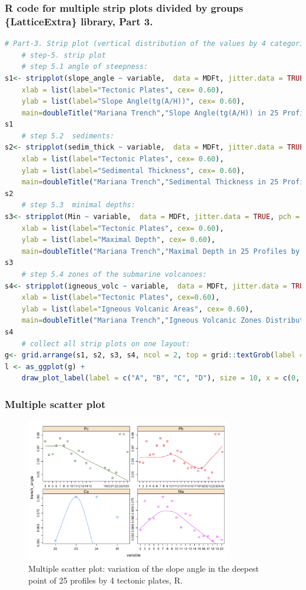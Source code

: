 \documentclass[pdflatex,compress,10pt,
	xcolor={dvipsnames,dvipsnames,svgnames,x11names,table},
	hyperref={colorlinks = true,breaklinks = true, urlcolor = NavyBlue, breaklinks = true}]{beamer}
\begin{document}
\begin{frame}[fragile,shrink=20]\frametitle{R code for multiple strip plots divided by groups\\ \{LatticeExtra\} library, Part 3.}
\begin{lstlisting}[language=R]
# Part-3. Strip plot (vertical distribution of the values by 4 categories))
	# step-5. strip plot 
	# step 5.1 angle of steepness:
s1<- stripplot(slope_angle ~ variable,  data = MDFt, jitter.data = TRUE, pch = 20,  palette="Set2",
	xlab = list(label="Tectonic Plates", cex= 0.60), 
	ylab = list(label="Slope Angle(tg(A/H))", cex= 0.60), 
	main=doubleTitle("Mariana Trench","Slope Angle(tg(A/H)) in 25 Profiles by Tectonic Plates"))
s1		
	# step 5.2  sediments:
s2<- stripplot(sedim_thick ~ variable,  data = MDFt, jitter.data = TRUE, pch = 20,  
	xlab = list(label="Tectonic Plates", cex= 0.60), 
	ylab = list(label="Sedimental Thickness", cex= 0.60), 
	main=doubleTitle("Mariana Trench","Sedimental Thickness in 25 Profiles by Tectonic Plates"))
s2	
	# step 5.3  minimal depths:
s3<- stripplot(Min ~ variable,  data = MDFt, jitter.data = TRUE, pch = 20,  
	xlab = list(label="Tectonic Plates", cex= 0.60), 
	ylab = list(label="Maximal Depth", cex= 0.60), 
	main=doubleTitle("Mariana Trench","Maximal Depth in 25 Profiles by Tectonic Plates"))
s3		
	# step 5.4 zones of the submarine volcanoes:
s4<- stripplot(igneous_volc ~ variable,  data = MDFt, jitter.data = TRUE, pch = 20,
	xlab = list(label="Tectonic Plates", cex=0.60), 
	ylab = list(label="Igneous Volcanic Areas", cex= 0.60),
	main=doubleTitle("Mariana Trench","Igneous Volcanic Zones Distribution in 25 Profiles by Tectonic Plates"))
s4
	# collect all strip plots on one layout:
g<- grid.arrange(s1, s2, s3, s4, ncol = 2, top = grid::textGrob(label = "Statistics: R Programming. Data Source: QGIS", x=0.1, hjust=0, gp=gpar(fontfamily="serif",fontsize=8, fontface="bold")))
l <- as_ggplot(g) + 
	draw_plot_label(label = c("A", "B", "C", "D"), size = 10, x = c(0, 0.5, 0, 0.5), y = c(1, 1, 0.5, 0.5))
\end{lstlisting}
\end{frame}

\begin{frame}\frametitle{Multiple scatter plot}
\begin{figure}[H]
	\centering
		\includegraphics[width=9cm]{Fig-3-3.jpg}\caption{Multiple scatter plot: variation of the slope angle in the deepest point of 25 profiles by 4 tectonic plates, R.}
\end{figure}		
\end{frame}
\end{document}
